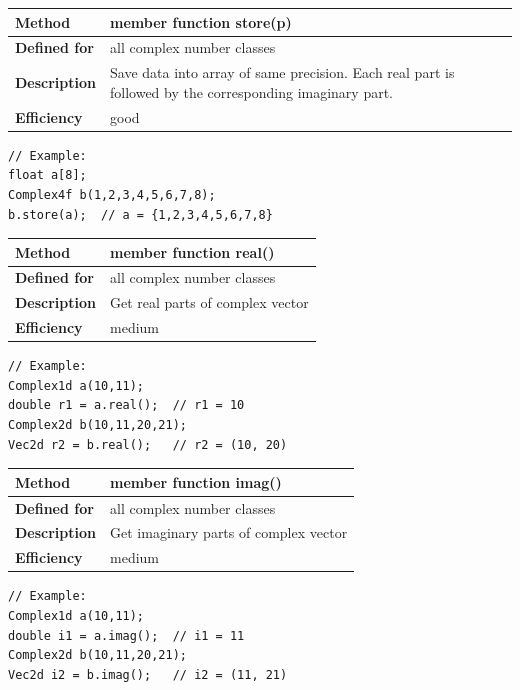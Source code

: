 \documentclass[11pt,a4paper,oneside,openright]{report}
\newcommand{\vspacesmall}{\vspace{3mm}}
\newcommand{\vspacebig}{\vspace{6mm}}
\begin{document}
\begin{tabular}{|p{25mm}|p{100mm}|}
\hline
\bfseries Method & member function store(p) \\ \hline
\bfseries Defined for & all complex number classes \\ \hline
\bfseries Description & Save data into array of same precision. 
Each real part is followed by the corresponding imaginary part. \\ \hline
\bfseries Efficiency & good \\ \hline
\end{tabular}
\vspacesmall

\begin{lstlisting}[frame=none]
// Example:
float a[8];
Complex4f b(1,2,3,4,5,6,7,8);
b.store(a);  // a = {1,2,3,4,5,6,7,8}
\end{lstlisting}
\vspacebig


\begin{tabular}{|p{25mm}|p{100mm}|}
\hline
\bfseries Method & member function real() \\ \hline
\bfseries Defined for & all complex number classes \\ \hline
\bfseries Description & Get real parts of complex vector \\ \hline
\bfseries Efficiency & medium \\ \hline
\end{tabular}
\vspacesmall

\begin{lstlisting}[frame=none]
// Example:
Complex1d a(10,11);
double r1 = a.real();  // r1 = 10
Complex2d b(10,11,20,21);
Vec2d r2 = b.real();   // r2 = (10, 20)

\end{lstlisting}
\vspacebig


\begin{tabular}{|p{25mm}|p{100mm}|}
\hline
\bfseries Method & member function imag() \\ \hline
\bfseries Defined for & all complex number classes \\ \hline
\bfseries Description & Get imaginary parts of complex vector \\ \hline
\bfseries Efficiency & medium \\ \hline
\end{tabular}
\vspacesmall

\begin{lstlisting}[frame=none]
// Example:
Complex1d a(10,11);
double i1 = a.imag();  // i1 = 11
Complex2d b(10,11,20,21);
Vec2d i2 = b.imag();   // i2 = (11, 21)
\end{lstlisting}
\vspacebig
\end{document}
